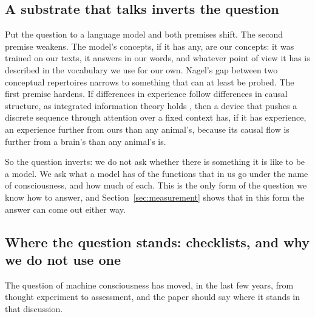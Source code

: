 \subsection{A substrate that talks inverts the question}

Put the question to a language model and both premises shift. The second premise weakens. The model's
concepts, if it has any, are our concepts: it was trained on our texts, it answers in our words, and
whatever point of view it has is described in the vocabulary we use for our own. Nagel's gap between
two conceptual repertoires narrows to something that can at least be probed. The first premise
hardens. If differences in experience follow differences in causal structure, as integrated
information theory holds \citep{tononi2015}, then a device that pushes a discrete sequence through
attention over a fixed context has, if it has experience, an experience further from ours than any
animal's, because its causal flow is further from a brain's than any animal's is.

So the question inverts: we do not ask whether there is something it is like to be a model. We ask
what a model has of the functions that in us go under the name of consciousness, and how much of
each. This is the only form of the question we know how to answer, and Section~\ref{sec:measurement}
shows that in this form the answer can come out either way.

\subsection{Where the question stands: checklists, and why we do not use one}

The question of machine consciousness has moved, in the last few years, from thought experiment to
assessment, and the paper should say where it stands in that discussion.

